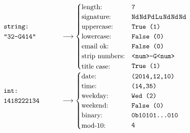 \newenvironment{stackedlines}{\renewcommand{\arraystretch}{1.2}\begin{array}[b]{@{}l@{\quad}l@{}}}{\end{array}}
\newcommand{\sigrule}[1]{\mbox{\texttt{\spaceskip=0.1em{#1}}}}

\begin{figure}[H]
  \newcommand{\largest}{strip numbers:}
  $\begin{stackedlines}
    \texttt{string:}\\
    \texttt{\parbox{\widthof{1418222134.325}}{"32-G414"}}
  \end{stackedlines} \longrightarrow
  \begin{cases}
    \text{length:} & \texttt{7}\\
    \text{signature:} & \sigrule{Nd Nd Pd Lu Nd Nd Nd}\\
    \text{uppercase:} & \texttt{True (1)}\\
    \text{lowercase:} & \texttt{False (0)}\\
    \text{email ok:} & \texttt{False (0)}\\
    \text{strip numbers:} & \texttt{<num>-G<num>}\\
    \text{\parbox{\widthof{\largest}}{title case:}} & \texttt{True (1)}
  \end{cases}\hfill$
  $\begin{stackedlines}
    \texttt{int:}\\
    \texttt{\parbox{\widthof{1418222134.325}}{1418222134}}
  \end{stackedlines} \longrightarrow
  \begin{cases}
    \text{date:} & \texttt{(2014,12,10)}\\
    \text{time:} & \texttt{(14,35)}\\
    \text{weekday:} & \texttt{Wed (2)}\\
    \text{weekend:} & \texttt{False (0)}\\
    \text{binary:} & \texttt{0b10101\ldots010}\\
    \text{\parbox{\widthof{\largest}}{mod-10:}} & \texttt{4}
  \end{cases}\hfill$

\end{figure}

